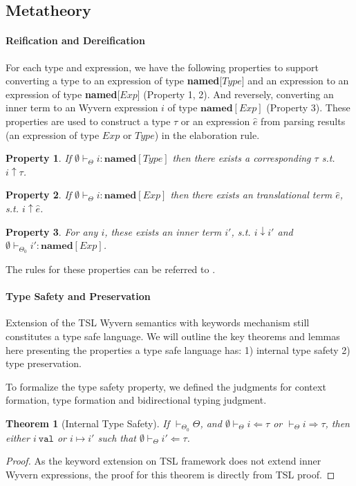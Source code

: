 \documentclass{sig-alternate}
\newtheorem{theorem}{Theorem}
\newtheorem{property}{Property}
\begin{document}
\subsection{Metatheory}
\paragraph{Reification and Dereification}
For each type and expression, we have the following properties to support converting a type to an expression of type \textbf{named}[$Type$] and an expression to an expression of type \textbf{named}[$Exp$] (Property 1, 2). And reversely, converting an inner term to an Wyvern expression $i$ of type $\mathbf{named}[Exp]$ (Property 3). These properties are used to construct a type $\tau$ or an expression $\hat{e}$ from parsing results (an expression of type $Exp$ or $Type$) in the elaboration rule. 
\begin{property}If $\emptyset\vdash_{\Theta} i:\mathbf{named}[Type]$ then there exists a corresponding $\tau$ s.t. $i\uparrow\tau$. 
\end{property}
\begin{property}
If $\emptyset\vdash_{\Theta} i:\mathbf{named}[Exp]$ then there exists an translational term $\hat{e}$, s.t. $i\uparrow\hat{e}$.
\end{property}

\begin{property}
For any $i$, these exists an inner term $i'$, s.t. $i\downarrow i'$ and $\emptyset\vdash_{\Theta_0} i':\mathbf{named}[Exp]$.
\end{property}
The rules for these properties can be referred to .

\paragraph{Type Safety and Preservation}
Extension of the TSL Wyvern semantics with keywords mechanism still constitutes a type safe language. We will outline the key theorems and lemmas here presenting the properties a type safe language has: 1) internal type safety 2) type preservation. 

To formalize the type safety property, we defined the judgments for context formation, type formation and bidirectional typing judgment. 

\begin{theorem}[Internal Type Safety]
If $\vdash_{\Theta_0}\Theta$, and $\emptyset\vdash_{\Theta}i\Leftarrow\tau$ or $\vdash_{\Theta}i\Rightarrow\tau$, then either $i~\texttt{val}$ or $i\mapsto i'$ such that $\emptyset\vdash_{\Theta}i'\Leftarrow\tau$.
\end{theorem}
\begin{proof}
As the keyword extension on TSL framework does not extend inner Wyvern expressions, the proof for this theorem is directly from TSL proof. 
\end{proof}
\end{document}
